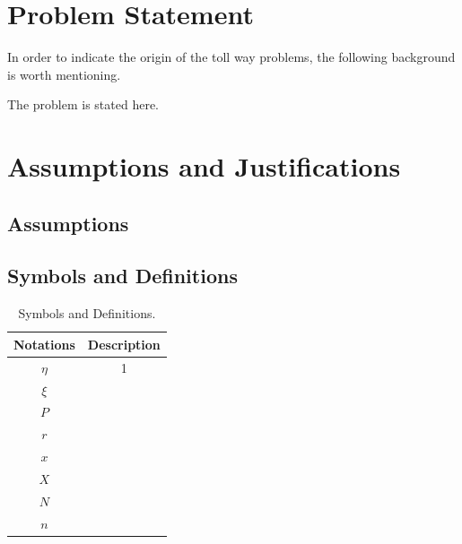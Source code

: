 \documentclass[11pt,a4]{article}
\begin{document}

\clearpage
\pagestyle{fancy}
\newpage
\setcounter{page}{1}

\section{Problem Statement}
\label{Problem_Statement}



In order to indicate the origin of the toll way problems, the following background is worth mentioning.

The problem is stated here.


\section{Assumptions and Justifications}
\label{Assumptions_Justifications}

\subsection{Assumptions}


\subsection{Symbols and Definitions}

\begin{table}[H]
\renewcommand{\arraystretch}{1.5}
\caption{Symbols and Definitions.}
\label{Table_Symbols}
\begin{center}
{\footnotesize
\begin{tabular}{c c}
\toprule
{Notations} & {Description} \\
\midrule
{$\eta$}    & {1} \\ 
{$\xi$}     & {} \\ 
$P$   & {} \\ 
$r$     & {} \\
$x$     & {} \\ 
$X$     & {} \\ 
$N$    & {} \\ 
$n$     & {} \\ 
\bottomrule
\end{tabular}}
\end{center}
\end{table}
\end{document}
